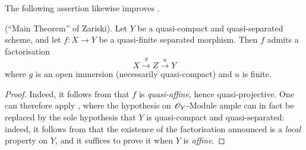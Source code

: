 The following assertion likewise improves .

\begin{corollary}[18.12.13]
\label{IV.18.12.13}
(``Main Theorem'' of Zariski).
Let $Y$ be a quasi-compact and quasi-separated scheme, and let $f:X\to Y$ be a quasi-finite separated morphism.
Then $f$ admits a factorisation
\[
  X\xrightarrow{g}Z\xrightarrow{u}Y
\]
where $g$ is an open immersion (necessarily quasi-compact) and $u$ is finite.
\end{corollary}

\begin{proof}
Indeed, it follows from  that $f$ is \emph{quasi-affine}, hence quasi-projective.
One can therefore apply , where the hypothesis on $\mathscr{O}_Y$-Module ample can in fact be replaced by the sole hypothesis that $Y$ is quasi-compact and quasi-separated: indeed, it follows from  that the existence of the factorisation announced is a \emph{local} property on $Y$, and it suffices to prove it when $Y$ is \emph{affine}.
\end{proof}

